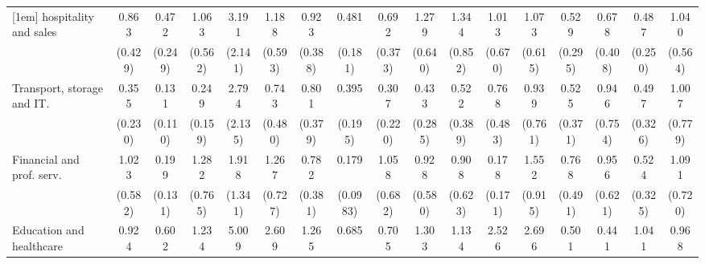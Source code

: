 {\begin{tabular}{l*{16}{c}}
[1em]
hospitality and sales&       0.863         &       0.472         &       1.063         &       3.191         &       1.188         &       0.923         &       0.481         &       0.692         &       1.279         &       1.344         &       1.013         &       1.073         &       0.529         &       0.678         &       0.487         &       1.040         \\
                    &     (0.429)         &     (0.249)         &     (0.562)         &     (2.141)         &     (0.593)         &     (0.388)         &     (0.181)         &     (0.373)         &     (0.640)         &     (0.852)         &     (0.670)         &     (0.615)         &     (0.295)         &     (0.408)         &     (0.250)         &     (0.564)         \\
[1em]
Transport, storage and IT.&       0.355         &       0.131\sym{*}  &       0.249\sym{*}  &       2.794         &       0.743         &       0.801         &       0.395         &       0.307         &       0.433         &       0.522         &       0.768         &       0.939         &       0.525         &       0.946         &       0.497         &       1.007         \\
                    &     (0.230)         &     (0.110)         &     (0.159)         &     (2.135)         &     (0.480)         &     (0.379)         &     (0.195)         &     (0.220)         &     (0.285)         &     (0.389)         &     (0.483)         &     (0.761)         &     (0.371)         &     (0.754)         &     (0.326)         &     (0.779)         \\
[1em]
Financial and prof. serv.&       1.023         &       0.199\sym{*}  &       1.282         &       1.918         &       1.267         &       0.782         &       0.179\sym{**} &       1.058         &       0.928         &       0.908         &       0.178         &       1.552         &       0.768         &       0.956         &       0.524         &       1.091         \\
                    &     (0.582)         &     (0.131)         &     (0.765)         &     (1.341)         &     (0.727)         &     (0.381)         &    (0.0983)         &     (0.682)         &     (0.580)         &     (0.623)         &     (0.171)         &     (0.915)         &     (0.491)         &     (0.621)         &     (0.325)         &     (0.720)         \\
[1em]
Education and healthcare&       0.924         &       0.602         &       1.234         &       5.009\sym{*}  &       2.609         &       1.265         &       0.685         &       0.705         &       1.303         &       1.134         &       2.526         &       2.696         &       0.501         &       0.441         &       1.041         &       0.968         \\

\end{tabular}}
